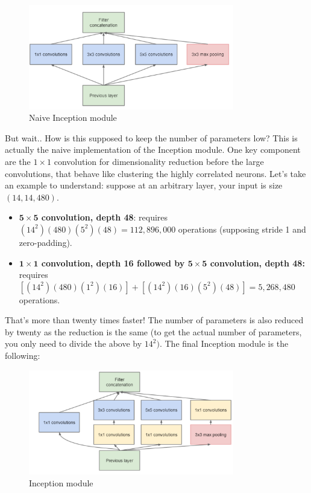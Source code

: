 \begin{figure}[H]
    \centering
    \includegraphics[width=0.8\textwidth]{Images/naiveinception.png}
    \caption{Naive Inception module \cite{googlenet}}
\end{figure}

But wait.. How is this supposed to keep the number of parameters low? This is actually the naive implementation of the Inception module. One key component are the $1\times 1$ convolution for dimensionality reduction before the large convolutions, that behave like clustering the highly correlated neurons. Let's take an example to understand: suppose at an arbitrary layer, your input is size $(14, 14, 480)$.
\begin{itemize}
\item \textbf{$\mathbf{5\times 5}$ convolution, depth 48}: requires $(14^2)(480)(5^2)(48) = 112,896,000$ operations (supposing stride 1 and zero-padding).
\item \textbf{$\mathbf{1\times 1}$ convolution, depth 16 followed by $\mathbf{5\times 5}$ convolution, depth 48:} requires $[(14^2)(480)(1^2)(16)] + [(14^2)(16)(5^2)(48)] = 5,268,480$ operations.
\end{itemize}

That's more than twenty times faster! The number of parameters is also reduced by twenty as the reduction is the same (to get the actual number of parameters, you only need to divide the above by $14^2)$. The final Inception module is the following:

\begin{figure}[H]
    \centering
    \includegraphics[width=0.8\textwidth]{Images/inception.png}
    \caption{Inception module \cite{googlenet}}
\end{figure}

